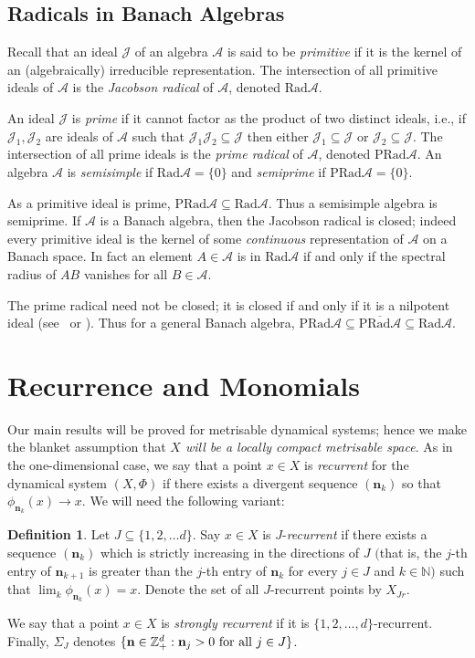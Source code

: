 \documentclass[12pt]{amsart}
\theoremstyle{definition}
\newtheorem{definition}[theorem]{Definition}
\newcommand{\mcA}{\mathcal{A}}
\newcommand{\mcJ}{\mathcal{J}}
\newcommand{\bbN}{\mathbb{N}}
\newcommand{\bbZ}{\mathbb{Z}}
\newcommand{\rad}{\mathrm{Rad}}
\newcommand{\prad}{\mathrm{PRad}}
\newcommand{\bo}[1]{\mathbf{#1}}
\newcommand{\bon}{\mathbf{n}}
\begin{document}
\subsection{Radicals in Banach Algebras}
Recall that an ideal $\mcJ$ of an algebra $\mcA$ is said to be
\emph{primitive} if it is the kernel of an (algebraically) irreducible
representation.
The intersection of all primitive ideals of $\mcA$ is the
\emph{Jacobson radical} of $\mcA$, denoted $\rad\mcA$.

An ideal $\mcJ$ is \emph{prime} if it cannot factor as the product
of two distinct ideals, i.e., if $\mcJ_1,\mcJ_2$ are ideals of
$\mcA$ such that $\mcJ_1\mcJ_2\subseteq\mcJ$ then either
$\mcJ_1\subseteq\mcJ$ or $\mcJ_2\subseteq\mcJ$. The intersection
of all prime ideals is the \emph{prime radical} of $\mcA$, denoted
$\prad\mcA$. An algebra $\mcA$ is \emph{semisimple} if $\rad\mcA=\{0\}$
and \emph{semiprime} if $\prad\mcA=\{0\}$.

As a primitive ideal is prime, $\prad\mcA \subseteq \rad\mcA$.
Thus a semisimple algebra is semiprime. If $\mcA$ is a
Banach algebra, then the Jacobson radical is closed; indeed every
primitive ideal is the kernel of some \emph{continuous}
representation of $\mcA$ on a Banach space. In fact an
element $A \in\mcA$ is in $\rad\mcA$ if and only if the spectral
radius of $AB$ vanishes for all $B \in\mcA$.

The prime radical need not be closed; it is closed if and only if
it is a nilpotent ideal
(see~\cite{Gra69} or \cite[Theorem~4.4.11]{Palmer94}).
Thus for a general Banach algebra,
$ \prad\mcA \subseteq \overline{\prad\mcA} \subseteq \rad\mcA$.


\section{Recurrence and Monomials}

Our main results will be proved for metrisable dynamical systems;
hence we make the blanket assumption that \emph{$X$ will be a
locally compact metrisable space}.
As in the one-dimensional case, we say that a point $x \in X$ is
\emph{recurrent} for the dynamical system $(X,\Phi)$ if there exists
a divergent sequence $(\bon_k)$ so that
$\phi_{\bon_k}(x)\to x$.
We will need the following variant:

\begin{definition}
Let $J\subseteq\{1,2,\ldots d\}$. Say $x\in X$ is
$J$-\emph{recurrent} if there exists a sequence $(\bon_{k})$
which is strictly increasing in the directions of $J$ $($that is,
the $j$-th entry of $\bon_{k+1}$ is greater than the $j$-th entry of
$\bon_{k}$ for every $j \in J$ and $k\in\bbN)$ such
that $\lim_{k}\phi_{\bon_{k}}(x)=x$.
Denote the set of all $J$-recurrent points by $X_{Jr}$.

We say that a point $x\in X$ is \emph{strongly recurrent}
if it is $\{1,2,\ldots,d\}$-recurrent.
Finally, $\Sigma_J$ denotes
$\{ \bo{n} \in \bbZ_+^d : \bo{n}_j > 0 \hbox{ for all } j\in J\}$.
\end{definition}
\end{document}
